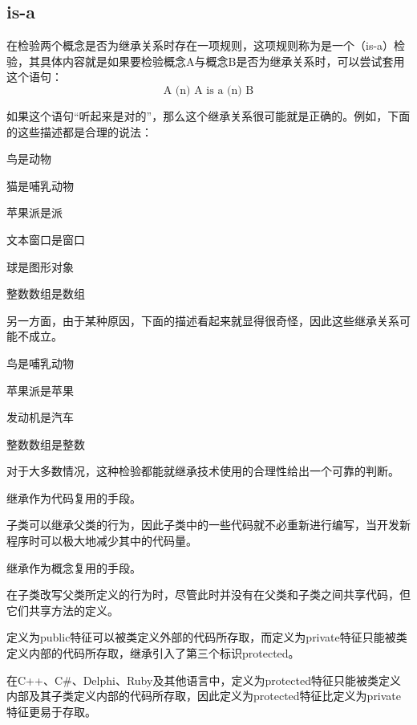 \subsection{is-a}

在检验两个概念是否为继承关系时存在一项规则，这项规则称为是一个（is-a）检验，其具体内容就是如果要检验概念A与概念B是否为继承关系时，可以尝试套用这个语句：
\[\mbox{A (n) A is a (n) B}\]

如果这个语句“听起来是对的”，那么这个继承关系很可能就是正确的。例如，下面的这些描述都是合理的说法：

\begin{compactenum}
\item 鸟是动物
\item 猫是哺乳动物
\item 苹果派是派
\item 文本窗口是窗口
\item 球是图形对象
\item 整数数组是数组
\end{compactenum}

另一方面，由于某种原因，下面的描述看起来就显得很奇怪，因此这些继承关系可能不成立。

\begin{compactenum}
\item 鸟是哺乳动物
\item 苹果派是苹果
\item 发动机是汽车
\item 整数数组是整数
\end{compactenum}

对于大多数情况，这种检验都能就继承技术使用的合理性给出一个可靠的判断。

\begin{compactitem}
\item 继承作为代码复用的手段。

子类可以继承父类的行为，因此子类中的一些代码就不必重新进行编写，当开发新程序时可以极大地减少其中的代码量。

\item 继承作为概念复用的手段。

在子类改写父类所定义的行为时，尽管此时并没有在父类和子类之间共享代码，但它们共享方法的定义。
\end{compactitem}

定义为public特征可以被类定义外部的代码所存取，而定义为private特征只能被类定义内部的代码所存取，继承引入了第三个标识protected。

在C++、C\#、Delphi、Ruby及其他语言中，定义为protected特征只能被类定义内部及其子类定义内部的代码所存取，因此定义为protected特征比定义为private特征更易于存取。



